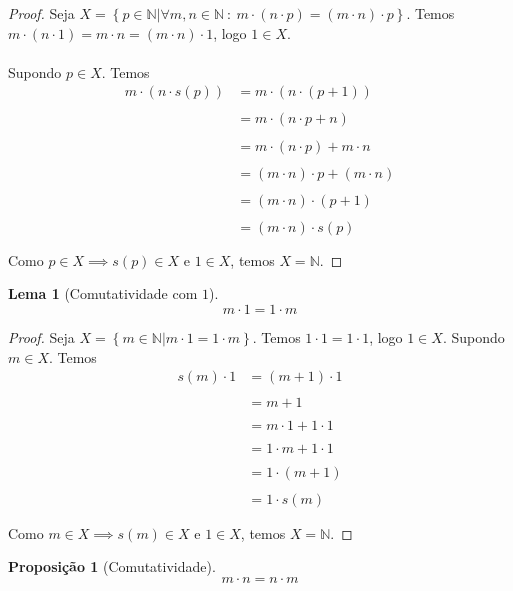 \documentclass{article}
\theoremstyle{plain}
\newtheorem{prop}{Proposição}
\newtheorem{lema}{Lema}
\theoremstyle{definition}
\theoremstyle{remark}
\begin{document}
\begin{proof}
	Seja $X = \left\{p \in \mathbb{N} | \forall m,n \in \mathbb{N} \: : \:  m\cdot( n\cdot p) = (m\cdot n )\cdot p \right\}$. Temos $m\cdot (n\cdot1) = m\cdot n = (m\cdot n ) \cdot 1$, logo $1\in X$. \\ ~\\ Supondo $p\in X$. Temos 
	 \begin{align*}
		 m\cdot (n\cdot s(p)) &= m\cdot(n\cdot ( p+1) )  \\~\\
		 &= m\cdot ( n\cdot p + n) \\~\\
		 &= m\cdot ( n\cdot p) + m\cdot n \\~\\
		 &= (m\cdot  n)\cdot p + (m\cdot n) \\~\\
		 &= (m\cdot  n)\cdot (p+1) \\~\\
		 &= (m\cdot  n)\cdot s(p) \\~\\
	\end{align*}
	Como $p\in X\implies s(p) \in X $ e $1\in X$, temos $X = \mathbb{N}$.
\end{proof}
\begin{lema}[Comutatividade com $1$]
	\label{comutatividade1}
	$$m\cdot 1 = 1 \cdot m $$
\end{lema}
\begin{proof}
	Seja $X = \left\{m \in \mathbb{N} |  m\cdot 1 = 1\cdot m  \right\}$. Temos $1\cdot 1 = 1\cdot 1  $, logo $1\in X$. Supondo $m\in X$. Temos 
	 \begin{align*}
		 s(m)\cdot 1 &= (m+1)\cdot 1   \\~\\
		 &= m+1  \\~\\
		 &= m\cdot 1 + 1\cdot1  \\~\\
		 &= 1\cdot m +1\cdot 1   \\~\\
		 &=1\cdot (m+1)   \\~\\
		 &=1\cdot s(m)   \\~\\
	\end{align*}
	Como $m\in X\implies s(m) \in X $ e $1\in X$, temos $X = \mathbb{N}$.
\end{proof}
\begin{prop}[Comutatividade]
	$$m\cdot n = n \cdot m $$
\end{prop}
\end{document}
